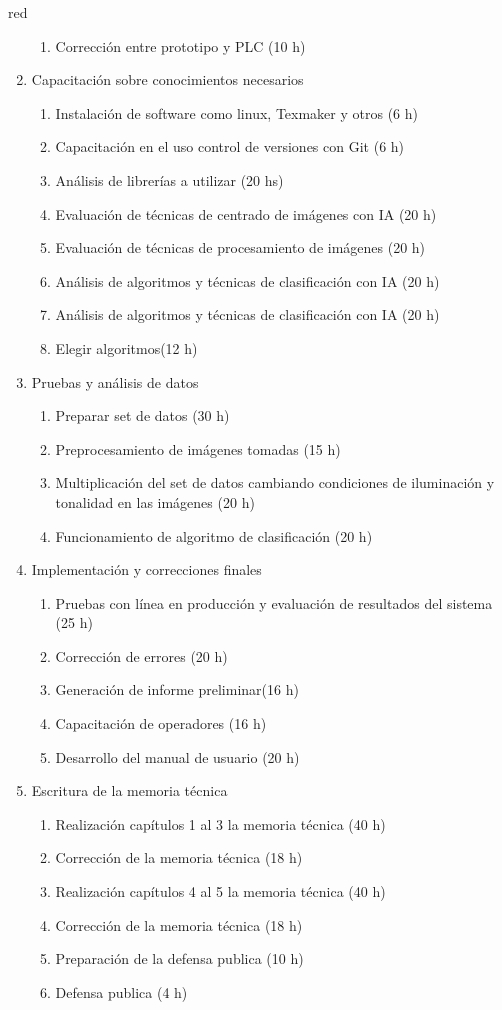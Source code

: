 \documentclass[11pt]{charter}
\begin{document}
\begin{consigna}{red}
\begin{enumerate}
\begin{enumerate}
	\item Corrección entre prototipo y PLC (10 h)
	\end{enumerate}
\item Capacitación sobre conocimientos necesarios
	\begin{enumerate}
	\item Instalación de software como linux, Texmaker y otros (6 h)
	\item Capacitación en el uso control de versiones con Git (6 h)
	\item Análisis de librerías a utilizar (20 hs)
	\item Evaluación de técnicas de centrado de imágenes con IA (20 h) 
	\item Evaluación de técnicas de procesamiento de imágenes (20 h)
	\item Análisis de algoritmos y técnicas de clasificación con IA (20 h)

	\item Análisis de algoritmos y técnicas de clasificación con IA (20 h)
	\item Elegir algoritmos(12 h)
	\end{enumerate}
\item Pruebas y análisis de datos
	\begin{enumerate}
	\item Preparar set de datos (30 h)
	\item Preprocesamiento de imágenes tomadas (15 h)
	\item Multiplicación del set de datos cambiando condiciones de iluminación y tonalidad en las imágenes (20 h)
	\item Funcionamiento de algoritmo de clasificación (20 h)
	\end{enumerate}
\item Implementación y correcciones finales
	\begin{enumerate}
	\item Pruebas con línea en producción y evaluación de resultados del sistema (25 h)
	\item Corrección de errores (20 h)
	\item Generación de informe preliminar(16 h)
	\item Capacitación de operadores (16 h)
	\item Desarrollo del manual de usuario (20 h)
	\end{enumerate}
\item Escritura de la memoria técnica
	\begin{enumerate}
	\item Realización capítulos 1 al 3 la memoria técnica (40 h) 
	\item Corrección de la memoria técnica (18 h)
	\item Realización capítulos 4 al 5 la memoria técnica (40 h)
	\item Corrección de la memoria técnica (18 h)
	\item Preparación de la defensa publica (10 h)
	\item Defensa publica (4 h)
	

\end{enumerate}
\end{enumerate}
\end{consigna}
\end{document}
